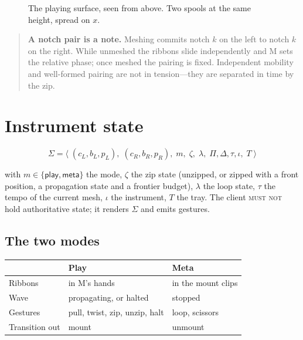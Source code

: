 \documentclass[11pt,a4paper]{article}
\newcommand{\MUSTNOT}{\textsc{must not}}
\theoremstyle{definition}
\theoremstyle{plain}
\theoremstyle{remark}
\newcommand{\spools}{%
  \fill[ribL,opacity=.45,rounded corners=2pt] (1.55,5.40) rectangle (2.45,5.95);
  \fill[ribR,opacity=.45,rounded corners=2pt] (5.55,5.40) rectangle (6.45,5.95);
  \node[font=\scriptsize] at (2,6.22) {left spool};
  \node[font=\scriptsize] at (6,6.22) {right spool};
}
\newcommand{\musician}{%
  \draw[gray] (4,-0.10) circle (0.23);
  \node[font=\scriptsize] at (4,-0.10) {M};
}
\newcommand{\axes}{%
  \draw[->,gray,thin] (0.85,4.30) -- (1.45,4.30) node[right,font=\scriptsize]{$x$};
  \draw[->,gray,thin] (0.85,4.30) -- (0.85,4.90) node[above,font=\scriptsize]{$z$};
}
\newcommand{\ribbonszipped}{%
  \draw[ribL,opacity=.45,line width=16pt,line join=round]
    (2,5.40) -- (2,4.60) -- (3.72,4.20) -- (3.72,2.20) -- (3.10,1.70) -- (3.10,0.70);
  \draw[ribR,opacity=.45,line width=16pt,line join=round]
    (6,5.40) -- (6,4.60) -- (4.28,4.20) -- (4.28,2.20) -- (4.90,1.70) -- (4.90,0.70);
}
\newcommand{\mesh}[2]{%
  \draw[gray!75,decorate,decoration={zigzag,segment length=5pt,amplitude=3pt}]
    (4,#1) -- (4,#2);
}
\newcommand{\mountclips}{%
  \fill[amb,opacity=.75,rounded corners=1pt] (3.76,1.05) rectangle (3.92,1.45);
  \fill[amb,opacity=.75,rounded corners=1pt] (4.08,1.05) rectangle (4.24,1.45);
}
\newcommand{\handat}[2]{\filldraw[fill=white,draw=gray!80,thin] (#1,#2) circle (0.17);}
\newcommand{\handsdefault}{\handat{3.10}{0.55}\handat{4.90}{0.55}}
\begin{document}
\begin{figure}[H]\centering
{}
\caption{The playing surface, seen from above. Two spools at the same height, spread on $x$.}
\end{figure}

\begin{quote}
\textbf{A notch pair is a note.} Meshing commits notch $k$ on the left to notch $k$ on the right.
While unmeshed the ribbons slide independently and M sets the relative phase; once meshed the
pairing is fixed. Independent mobility and well-formed pairing are not in tension---they are
separated in time by the zip.
\end{quote}

\section{Instrument state}

\[
\Sigma = \big\langle\;
(c_L,b_L,p_L),\; (c_R,b_R,p_R),\;
m,\; \zeta,\; \lambda,\;
\Pi,\Delta,\tau,\iota,\; T
\;\big\rangle
\]

with $m \in \{\textsf{play}, \textsf{meta}\}$ the mode, $\zeta$ the zip state (unzipped, or
zipped with a front position, a propagation state and a frontier budget), $\lambda$ the loop
state, $\tau$ the tempo of the current mesh, $\iota$ the instrument, $T$ the tray. The client
\MUSTNOT{} hold authoritative state; it renders $\Sigma$ and emits gestures.

\subsection{The two modes}

\begin{center}
\begin{tabular}{lll}
\toprule
 & \textbf{Play} & \textbf{Meta} \\
\midrule
Ribbons        & in M's hands            & in the mount clips \\
Wave           & propagating, or halted  & stopped \\
Gestures       & pull, twist, zip, unzip, halt & loop, scissors \\
Transition out & mount                   & unmount \\
\bottomrule
\end{tabular}
\end{center}
\end{document}
